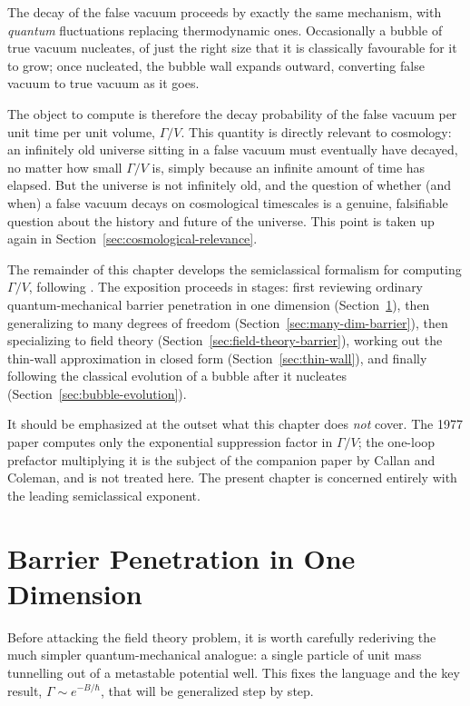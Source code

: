 The decay of the false vacuum proceeds by exactly the same mechanism, with \emph{quantum} fluctuations replacing thermodynamic ones. Occasionally a bubble of true vacuum nucleates, of just the right size that it is classically favourable for it to grow; once nucleated, the bubble wall expands outward, converting false vacuum to true vacuum as it goes.

The object to compute is therefore the decay probability of the false vacuum per unit time per unit volume, $\Gamma/V$. This quantity is directly relevant to cosmology: an infinitely old universe sitting in a false vacuum must eventually have decayed, no matter how small $\Gamma/V$ is, simply because an infinite amount of time has elapsed. But the universe is not infinitely old, and the question of whether (and when) a false vacuum decays on cosmological timescales is a genuine, falsifiable question about the history and future of the universe. This point is taken up again in Section~\ref{sec:cosmological-relevance}.

The remainder of this chapter develops the semiclassical formalism for computing $\Gamma/V$, following \cite{Coleman1977}. The exposition proceeds in stages: first reviewing ordinary quantum-mechanical barrier penetration in one dimension (Section~\ref{sec:1d-barrier}), then generalizing to many degrees of freedom (Section~\ref{sec:many-dim-barrier}), then specializing to field theory (Section~\ref{sec:field-theory-barrier}), working out the thin-wall approximation in closed form (Section~\ref{sec:thin-wall}), and finally following the classical evolution of a bubble after it nucleates (Section~\ref{sec:bubble-evolution}).

It should be emphasized at the outset what this chapter does \emph{not} cover. The 1977 paper computes only the exponential suppression factor in $\Gamma/V$; the one-loop prefactor multiplying it is the subject of the companion paper by Callan and Coleman, and is not treated here. The present chapter is concerned entirely with the leading semiclassical exponent.

\section{Barrier Penetration in One Dimension}
\label{sec:1d-barrier}

Before attacking the field theory problem, it is worth carefully rederiving the much simpler quantum-mechanical analogue: a single particle of unit mass tunnelling out of a metastable potential well. This fixes the language and the key result, $\Gamma \sim e^{-B/\hbar}$, that will be generalized step by step.

